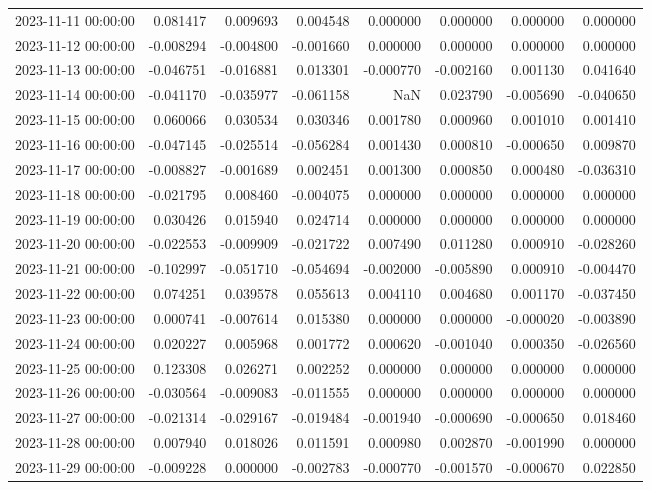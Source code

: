 \begin{tabular}{lrrrrrrr}
2023-11-11 00:00:00 & 0.081417 & 0.009693 & 0.004548 & 0.000000 & 0.000000 & 0.000000 & 0.000000 \\
2023-11-12 00:00:00 & -0.008294 & -0.004800 & -0.001660 & 0.000000 & 0.000000 & 0.000000 & 0.000000 \\
2023-11-13 00:00:00 & -0.046751 & -0.016881 & 0.013301 & -0.000770 & -0.002160 & 0.001130 & 0.041640 \\
2023-11-14 00:00:00 & -0.041170 & -0.035977 & -0.061158 & NaN & 0.023790 & -0.005690 & -0.040650 \\
2023-11-15 00:00:00 & 0.060066 & 0.030534 & 0.030346 & 0.001780 & 0.000960 & 0.001010 & 0.001410 \\
2023-11-16 00:00:00 & -0.047145 & -0.025514 & -0.056284 & 0.001430 & 0.000810 & -0.000650 & 0.009870 \\
2023-11-17 00:00:00 & -0.008827 & -0.001689 & 0.002451 & 0.001300 & 0.000850 & 0.000480 & -0.036310 \\
2023-11-18 00:00:00 & -0.021795 & 0.008460 & -0.004075 & 0.000000 & 0.000000 & 0.000000 & 0.000000 \\
2023-11-19 00:00:00 & 0.030426 & 0.015940 & 0.024714 & 0.000000 & 0.000000 & 0.000000 & 0.000000 \\
2023-11-20 00:00:00 & -0.022553 & -0.009909 & -0.021722 & 0.007490 & 0.011280 & 0.000910 & -0.028260 \\
2023-11-21 00:00:00 & -0.102997 & -0.051710 & -0.054694 & -0.002000 & -0.005890 & 0.000910 & -0.004470 \\
2023-11-22 00:00:00 & 0.074251 & 0.039578 & 0.055613 & 0.004110 & 0.004680 & 0.001170 & -0.037450 \\
2023-11-23 00:00:00 & 0.000741 & -0.007614 & 0.015380 & 0.000000 & 0.000000 & -0.000020 & -0.003890 \\
2023-11-24 00:00:00 & 0.020227 & 0.005968 & 0.001772 & 0.000620 & -0.001040 & 0.000350 & -0.026560 \\
2023-11-25 00:00:00 & 0.123308 & 0.026271 & 0.002252 & 0.000000 & 0.000000 & 0.000000 & 0.000000 \\
2023-11-26 00:00:00 & -0.030564 & -0.009083 & -0.011555 & 0.000000 & 0.000000 & 0.000000 & 0.000000 \\
2023-11-27 00:00:00 & -0.021314 & -0.029167 & -0.019484 & -0.001940 & -0.000690 & -0.000650 & 0.018460 \\
2023-11-28 00:00:00 & 0.007940 & 0.018026 & 0.011591 & 0.000980 & 0.002870 & -0.001990 & 0.000000 \\
2023-11-29 00:00:00 & -0.009228 & 0.000000 & -0.002783 & -0.000770 & -0.001570 & -0.000670 & 0.022850 \\

\end{tabular}
